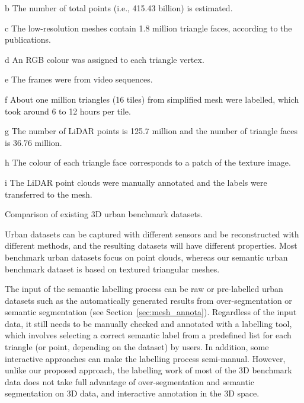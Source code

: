 \begin{sidewaystable}
{\begin{threeparttable}
\begin{tablenotes}
  	\item[b] The number of total points (i.e., 415.43 billion) is estimated.
	\item[c] The low-resolution meshes contain 1.8 million triangle faces, according to the publications.
	\item[d] An RGB colour was assigned to each triangle vertex.
	\item[e] The frames were from video sequences.
	\item[f] About one million triangles (16 tiles) from simplified mesh were labelled, which took around 6 to 12 hours per tile.
	\item[g] The number of LiDAR points is 125.7 million and the number of triangle faces is 36.76 million.
	\item[h] The colour of each triangle face corresponds to a patch of the texture image.
	\item[i] The LiDAR point clouds were manually annotated and the labels were transferred to the mesh.
  \end{tablenotes}
\end{threeparttable}
}
\caption{Comparison of existing 3D urban benchmark datasets.} 
\label{tab:overview}
\end{sidewaystable}

Urban datasets can be captured with different sensors and be reconstructed with different methods, and the resulting datasets will have different properties.
Most benchmark urban datasets focus on point clouds, whereas our semantic urban benchmark dataset is based on textured triangular meshes.

The input of the semantic labelling process can be raw or pre-labelled urban datasets such as the automatically generated results from over-segmentation or semantic segmentation (see Section~\ref{sec:mesh_annota}).
Regardless of the input data, it still needs to be manually checked and annotated with a labelling tool, which involves selecting a correct semantic label from a predefined list for each triangle (or point, depending on the dataset) by users.
In addition, some interactive approaches can make the labelling process semi-manual.                                                                                                                                        
However, unlike our proposed approach, the labelling work of most of the 3D benchmark data does not take full advantage of over-segmentation and semantic segmentation on 3D data, and interactive annotation in the 3D space.      
%

